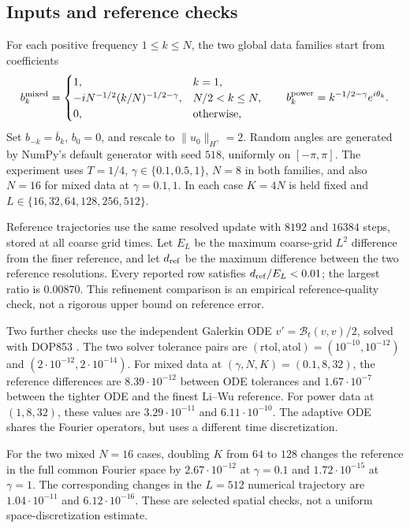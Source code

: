 \documentclass[11pt]{article}
\theoremstyle{remark}\newtheorem{remark}[theorem]{Remark}
\newcommand{\cB}{\mathcal B}
\begin{document}
\subsection{Inputs and reference checks}
For each positive frequency $1\leq k\leq N$, the two global data families
start from coefficients
\[
b_k^{\rm mixed}=\begin{cases}
1,&k=1,\\
-iN^{-1/2}(k/N)^{-1/2-\gamma},&N/2<k\leq N,\\
0,&\text{otherwise},
\end{cases}
\qquad
b_k^{\rm power}=k^{-1/2-\gamma}e^{i\theta_k}.
\]
Set $b_{-k}=\overline b_k$, $b_0=0$, and rescale to
$\|u_0\|_{H^\gamma}=2$. Random angles are generated by NumPy's
default generator with seed $518$, uniformly on $[-\pi,\pi]$.
The experiment uses $T=1/4$, $\gamma\in\{0.1,0.5,1\}$,
$N=8$ in both families, and also $N=16$ for mixed data at
$\gamma=0.1,1$. In each case $K=4N$ is held fixed and
$L\in\{16,32,64,128,256,512\}$.

Reference trajectories use the same resolved update with $8192$ and
$16384$ steps, stored at all coarse grid times. Let $E_L$ be the maximum
coarse-grid $L^2$ difference from the finer reference, and let $d_{\rm ref}$
be the maximum difference between the two reference resolutions. Every
reported row satisfies $d_{\rm ref}/E_L<0.01$; the largest ratio is
$0.00870$. This refinement comparison is an empirical reference-quality
check, not a rigorous upper bound on reference error.

Two further checks use the independent Galerkin ODE
$v'=\cB_t(v,v)/2$, solved with DOP853 \cite{SCIPY}. The two solver
tolerance pairs are $(\mathrm{rtol},\mathrm{atol})=(10^{-10},10^{-12})$
and $(2\cdot10^{-12},2\cdot10^{-14})$. For mixed data at
$(\gamma,N,K)=(0.1,8,32)$, the reference differences are
$8.39\cdot10^{-12}$ between ODE tolerances and $1.67\cdot10^{-7}$
between the tighter ODE and the finest Li--Wu reference. For power data
at $(1,8,32)$, these values are $3.29\cdot10^{-11}$ and
$6.11\cdot10^{-10}$. The adaptive ODE shares the Fourier operators,
but uses a different time discretization.

For the two mixed $N=16$ cases, doubling $K$ from $64$ to $128$
changes the reference in the full common Fourier space by
$2.67\cdot10^{-12}$ at $\gamma=0.1$ and
$1.72\cdot10^{-15}$ at $\gamma=1$. The corresponding changes in the
$L=512$ numerical trajectory are $1.04\cdot10^{-11}$ and
$6.12\cdot10^{-16}$. These are selected spatial checks, not a uniform
space-discretization estimate.
\end{document}
